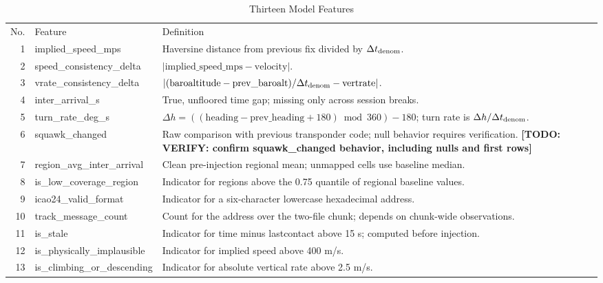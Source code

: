 \documentclass[conference]{IEEEtran}
\newcommand{\todo}[1]{\textbf{[TODO: #1]}}
\begin{document}
\begin{table}[t]\caption{Thirteen Model Features}\label{tab:features}\centering\scriptsize

\begin{tabularx}{\textwidth}{r l X}\toprule No. & Feature & Definition \\

1 & implied\_speed\_mps & Haversine distance from previous fix divided by $\Delta t_{\rm denom}$. \\

2 & speed\_consistency\_delta & $|\mathrm{implied\_speed\_mps}-\mathrm{velocity}|$. \\

3 & vrate\_consistency\_delta & $| (\mathrm{baroaltitude}-\mathrm{prev\_baroalt})/\Delta t_{\rm denom}-\mathrm{vertrate}|$. \\

4 & inter\_arrival\_s & True, unfloored time gap; missing only across session breaks. \\

5 & turn\_rate\_deg\_s & $\Delta h=((\mathrm{heading}-\mathrm{prev\_heading}+180)\bmod360)-180$; turn rate is $\Delta h/\Delta t_{\rm denom}$. \\

6 & squawk\_changed & Raw comparison with previous transponder code; null behavior requires verification. \todo{VERIFY: confirm squawk\_changed behavior, including nulls and first rows} \\

7 & region\_avg\_inter\_arrival & Clean pre-injection regional mean; unmapped cells use baseline median. \\

8 & is\_low\_coverage\_region & Indicator for regions above the 0.75 quantile of regional baseline values. \\

9 & icao24\_valid\_format & Indicator for a six-character lowercase hexadecimal address. \\

10 & track\_message\_count & Count for the address over the two-file chunk; depends on chunk-wide observations. \\

11 & is\_stale & Indicator for time minus lastcontact above 15 s; computed before injection. \\

12 & is\_physically\_implausible & Indicator for implied speed above 400 m/s. \\

13 & is\_climbing\_or\_descending & Indicator for absolute vertical rate above 2.5 m/s. \\

\bottomrule\end{tabularx}\end{table}
\end{document}
